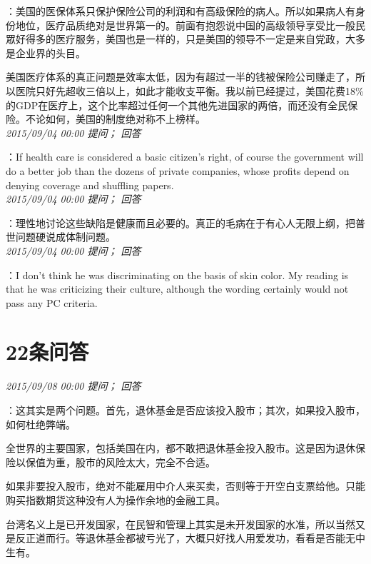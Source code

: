 \documentclass[twocolumn]{ctexart}
\begin{document}
：美国的医保体系只保护保险公司的利润和有高级保险的病人。所以如果病人有身份地位，医疗品质绝对是世界第一的。前面有抱怨说中国的高级领导享受比一般民眾好得多的医疗服务，美国也是一样的，只是美国的领导不一定是来自党政，大多是企业界的头目。

美国医疗体系的真正问题是效率太低，因为有超过一半的钱被保险公司赚走了，所以医院只好先超收三倍以上，如此才能收支平衡。我以前已经提过，美国花费18\%的GDP在医疗上，这个比率超过任何一个其他先进国家的两倍，而还没有全民保险。不论如何，美国的制度绝对称不上榜样。\\

\textit{\hfill\noindent\small 2015/09/04 00:00 提问； 回答}

：If health care is considered a basic citizen's right, of course the government will do a better job than the dozens of private companies, whose profits depend on denying coverage and shuffling papers.\\

\textit{\hfill\noindent\small 2015/09/04 00:00 提问； 回答}

：理性地讨论这些缺陷是健康而且必要的。真正的毛病在于有心人无限上纲，把普世问题硬说成体制问题。\\

\textit{\hfill\noindent\small 2015/09/04 00:00 提问； 回答}

：I don't think he was discriminating on the basis of skin color. My reading is that he was criticizing their culture, although the wording certainly would not pass any PC criteria.\\

\section{22条问答}

\textit{\hfill\noindent\small 2015/09/08 00:00 提问； 回答}

：这其实是两个问题。首先，退休基金是否应该投入股市；其次，如果投入股市，如何杜绝弊端。

全世界的主要国家，包括美国在内，都不敢把退休基金投入股市。这是因为退休保险以保值为重，股市的风险太大，完全不合适。

如果非要投入股市，绝对不能雇用中介人来买卖，否则等于开空白支票给他。只能购买指数期货这种没有人为操作余地的金融工具。

台湾名义上是已开发国家，在民智和管理上其实是未开发国家的水准，所以当然又是反正道而行。等退休基金都被亏光了，大概只好找人用爱发功，看看是否能无中生有。\\
\end{document}
